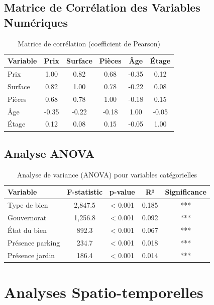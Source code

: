 \subsection{Matrice de Corrélation des Variables Numériques}

\begin{table}[H]
\centering
\caption{Matrice de corrélation (coefficient de Pearson)}
\begin{tabular}{|l|c|c|c|c|c|}
\hline
\textbf{Variable} & \textbf{Prix} & \textbf{Surface} & \textbf{Pièces} & \textbf{Âge} & \textbf{Étage} \\
\hline
Prix & 1.00 & 0.82 & 0.68 & -0.35 & 0.12 \\
Surface & 0.82 & 1.00 & 0.78 & -0.22 & 0.08 \\
Pièces & 0.68 & 0.78 & 1.00 & -0.18 & 0.15 \\
Âge & -0.35 & -0.22 & -0.18 & 1.00 & -0.05 \\
Étage & 0.12 & 0.08 & 0.15 & -0.05 & 1.00 \\
\hline
\end{tabular}
\end{table}

\subsection{Analyse ANOVA}

\begin{table}[H]
\centering
\caption{Analyse de variance (ANOVA) pour variables catégorielles}
\begin{tabular}{|l|c|c|c|c|}
\hline
\textbf{Variable} & \textbf{F-statistic} & \textbf{p-value} & \textbf{R²} & \textbf{Significance} \\
\hline
Type de bien & 2,847.5 & < 0.001 & 0.185 & *** \\
Gouvernorat & 1,256.8 & < 0.001 & 0.092 & *** \\
État du bien & 892.3 & < 0.001 & 0.067 & *** \\
Présence parking & 234.7 & < 0.001 & 0.018 & *** \\
Présence jardin & 186.4 & < 0.001 & 0.014 & *** \\
\hline
\end{tabular}
\end{table}

\section{Analyses Spatio-temporelles}

